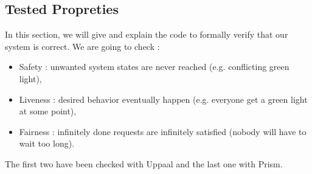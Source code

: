 
\subsection{Tested Propreties}
In this section, we will give and explain the code to formally verify that our system is correct. We are going to check :
\begin{itemize}
	\item Safety : unwanted system states are never reached (e.g. conflicting green light),
	\item Liveness : desired behavior eventually happen (e.g. everyone get a green light at some point),
	\item Fairness : infinitely done requests are infinitely satisfied (nobody will have to wait too long).
\end{itemize}

The first two have been checked with Uppaal and the last one with Prism.

